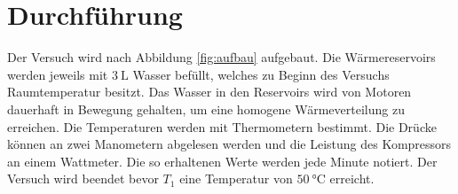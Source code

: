 \section{Durchführung}
\label{sec:Durchführung}
Der Versuch wird nach Abbildung \ref{fig:aufbau} aufgebaut.
Die Wärmereservoirs werden jeweils mit $\SI{3}{\liter}$ Wasser befüllt, welches zu Beginn des Versuchs Raumtemperatur besitzt.
Das Wasser in den Reservoirs wird von Motoren dauerhaft in Bewegung gehalten, um eine homogene Wärmeverteilung zu erreichen.
Die Temperaturen werden mit Thermometern bestimmt.
Die Drücke können an zwei Manometern abgelesen werden und die Leistung des Kompressors an einem Wattmeter.
Die so erhaltenen Werte werden jede Minute notiert.
Der Versuch wird beendet bevor $T_1$ eine Temperatur von $\SI{50}{\celsius}$ erreicht.
